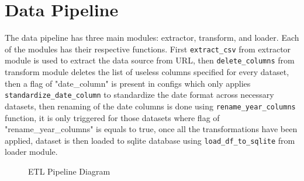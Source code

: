 \documentclass[a4paper,11pt]{article}
\begin{document}
\section{Data Pipeline}
The data pipeline has three main modules: extractor, transform, and loader. Each of the modules has their respective functions.
First \texttt{extract\_csv} from extractor module is used to extract the data source from URL, then \texttt{delete\_columns} from transform module deletes the list of useless columns specified for every dataset, then a flag of "date\_column" is present in configs which only applies \texttt{standardize\_date\_column} to standardize the date format across necessary datasets, then renaming of the date columns is done using \texttt{rename\_year\_columns} function, it is only triggered for those datasets where flag  of "rename\_year\_columns" is equals to true, once all the transformations have been applied, dataset is then loaded to sqlite database using \texttt{load\_df\_to\_sqlite} from loader module.


\begin{figure}[h]
    \centering
    \caption{ETL Pipeline Diagram}
    \label{fig:etl_pipeline}
\end{figure}
\end{document}
